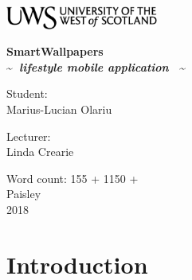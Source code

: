\documentclass[]{article}
\begin{document}
\begin{titlepage}
	\begin{center}	
		\includegraphics[width = 5cm,height = 1.5cm]{./imgs/uws_logo.png}\\[5cm]
	
{ \huge \bfseries %
		SmartWallpapers\\ \Large
		\textasciitilde \textit{~lifestyle mobile application~} \textasciitilde\\ 
}
	\vspace{2cm}			
			
		\begin{flushright}
				\large Student:\\
				Marius-Lucian Olariu\\[1cm]
		\end{flushright}
		
	
		\begin{flushleft}
			 \large
				Lecturer: \\
				Linda Crearie \\[1cm]
		\end{flushleft}
		
	\vspace{2cm}	
	
		
		\vfill
		
		{\large {Word count: 155 + 1150 +\\ Paisley \\ 2018}}
		\end{center}
\end{titlepage}

\newpage

\tableofcontents

\newpage

\section{Introduction}
\end{document}
